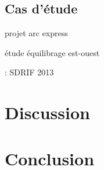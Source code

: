 \documentclass[french]{./sageo}
\begin{document}
\subsection{Cas d'étude}


\cite{damm1980response}

\cite{stif2007arc} projet arc express

\cite{beaucire2013grand} étude équilibrage est-ouest

\cite{sdrif2013} : SDRIF 2013





\section{Discussion}




\section{Conclusion}














\end{document}
